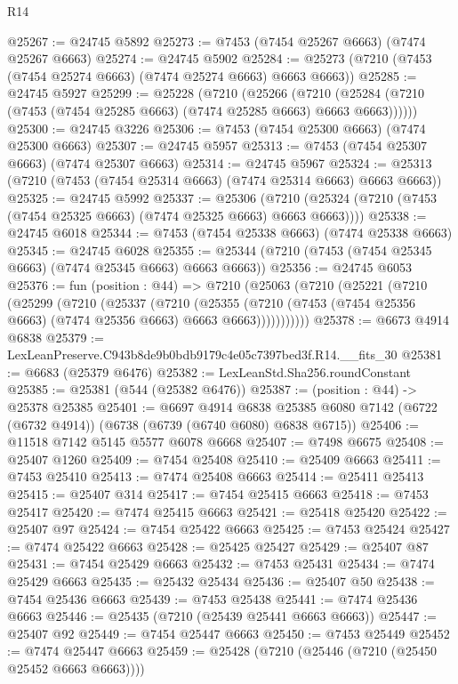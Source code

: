 \begin{lexlean}{R14}
\begin{coremodule}
@25267 := @24745 @5892
@25273 := @7453 (@7454 @25267 @6663) (@7474 @25267 @6663)
@25274 := @24745 @5902
@25284 := @25273 (@7210 (@7453 (@7454 @25274 @6663) (@7474 @25274 @6663) @6663 @6663))
@25285 := @24745 @5927
@25299 := @25228
    (@7210
      (@25266
        (@7210 (@25284 (@7210 (@7453 (@7454 @25285 @6663) (@7474 @25285 @6663) @6663 @6663))))))
@25300 := @24745 @3226
@25306 := @7453 (@7454 @25300 @6663) (@7474 @25300 @6663)
@25307 := @24745 @5957
@25313 := @7453 (@7454 @25307 @6663) (@7474 @25307 @6663)
@25314 := @24745 @5967
@25324 := @25313 (@7210 (@7453 (@7454 @25314 @6663) (@7474 @25314 @6663) @6663 @6663))
@25325 := @24745 @5992
@25337 := @25306
    (@7210 (@25324 (@7210 (@7453 (@7454 @25325 @6663) (@7474 @25325 @6663) @6663 @6663))))
@25338 := @24745 @6018
@25344 := @7453 (@7454 @25338 @6663) (@7474 @25338 @6663)
@25345 := @24745 @6028
@25355 := @25344 (@7210 (@7453 (@7454 @25345 @6663) (@7474 @25345 @6663) @6663 @6663))
@25356 := @24745 @6053
@25376 := fun (position : @44) =>
  @7210
    (@25063
      (@7210
        (@25221
          (@7210
            (@25299
              (@7210
                (@25337
                  (@7210
                    (@25355
                      (@7210 (@7453 (@7454 @25356 @6663) (@7474 @25356 @6663) @6663 @6663)))))))))))
@25378 := @6673 @4914 @6838
@25379 := LexLeanPreserve.C943b8de9b0bdb9179c4e05c7397bed3f.R14.__fits_30
@25381 := @6683 (@25379 @6476)
@25382 := LexLeanStd.Sha256.roundConstant
@25385 := @25381 (@544 (@25382 @6476))
@25387 := (position : @44) -> @25378 @25385
@25401 := @6697
    @4914
    @6838
    @25385
    @6080
    @7142
    (@6722 (@6732 @4914))
    (@6738 (@6739 (@6740 @6080) @6838 @6715))
@25406 := @11518 @7142 @5145 @5577 @6078 @6668
@25407 := @7498 @6675
@25408 := @25407 @1260
@25409 := @7454 @25408
@25410 := @25409 @6663
@25411 := @7453 @25410
@25413 := @7474 @25408 @6663
@25414 := @25411 @25413
@25415 := @25407 @314
@25417 := @7454 @25415 @6663
@25418 := @7453 @25417
@25420 := @7474 @25415 @6663
@25421 := @25418 @25420
@25422 := @25407 @97
@25424 := @7454 @25422 @6663
@25425 := @7453 @25424
@25427 := @7474 @25422 @6663
@25428 := @25425 @25427
@25429 := @25407 @87
@25431 := @7454 @25429 @6663
@25432 := @7453 @25431
@25434 := @7474 @25429 @6663
@25435 := @25432 @25434
@25436 := @25407 @50
@25438 := @7454 @25436 @6663
@25439 := @7453 @25438
@25441 := @7474 @25436 @6663
@25446 := @25435 (@7210 (@25439 @25441 @6663 @6663))
@25447 := @25407 @92
@25449 := @7454 @25447 @6663
@25450 := @7453 @25449
@25452 := @7474 @25447 @6663
@25459 := @25428 (@7210 (@25446 (@7210 (@25450 @25452 @6663 @6663))))

\end{coremodule}
\end{lexlean}
